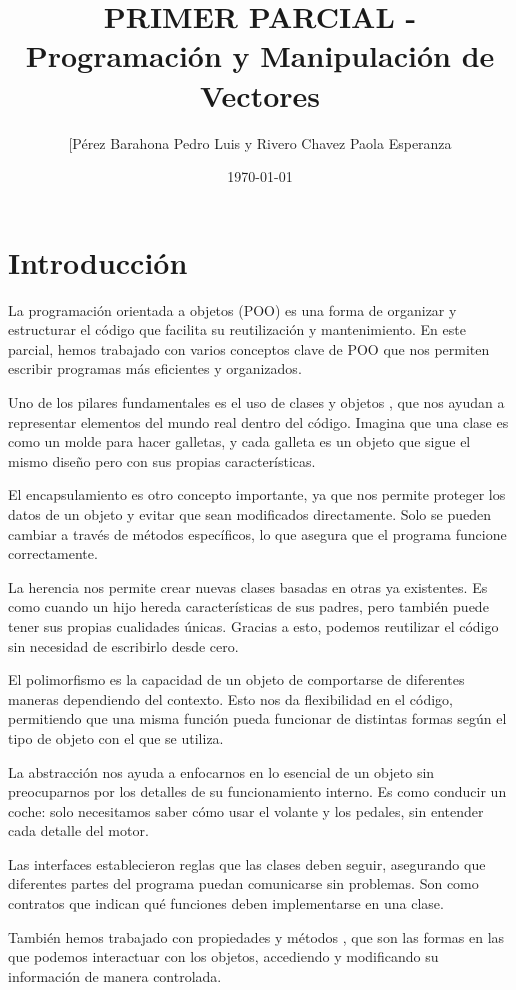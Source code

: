 \documentclass{article}
\title{PRIMER PARCIAL - Programaci\'on y Manipulaci\'on de Vectores}
\author{[Pérez Barahona Pedro Luis y Rivero Chavez Paola Esperanza}
\date{\today}
\begin{document}
\maketitle

\section{Introducci\'on}
La programación orientada a objetos (POO) es una forma de organizar y estructurar el código que facilita su reutilización y mantenimiento. En este parcial, hemos trabajado con varios conceptos clave de POO que nos permiten escribir programas más eficientes y organizados.

Uno de los pilares fundamentales es el uso de clases y objetos , que nos ayudan a representar elementos del mundo real dentro del código. Imagina que una clase es como un molde para hacer galletas, y cada galleta es un objeto que sigue el mismo diseño pero con sus propias características.

El encapsulamiento es otro concepto importante, ya que nos permite proteger los datos de un objeto y evitar que sean modificados directamente. Solo se pueden cambiar a través de métodos específicos, lo que asegura que el programa funcione correctamente.

La herencia nos permite crear nuevas clases basadas en otras ya existentes. Es como cuando un hijo hereda características de sus padres, pero también puede tener sus propias cualidades únicas. Gracias a esto, podemos reutilizar el código sin necesidad de escribirlo desde cero.

El polimorfismo es la capacidad de un objeto de comportarse de diferentes maneras dependiendo del contexto. Esto nos da flexibilidad en el código, permitiendo que una misma función pueda funcionar de distintas formas según el tipo de objeto con el que se utiliza.

La abstracción nos ayuda a enfocarnos en lo esencial de un objeto sin preocuparnos por los detalles de su funcionamiento interno. Es como conducir un coche: solo necesitamos saber cómo usar el volante y los pedales, sin entender cada detalle del motor.

Las interfaces establecieron reglas que las clases deben seguir, asegurando que diferentes partes del programa puedan comunicarse sin problemas. Son como contratos que indican qué funciones deben implementarse en una clase.

También hemos trabajado con propiedades y métodos , que son las formas en las que podemos interactuar con los objetos, accediendo y modificando su información de manera controlada.
\end{document}

